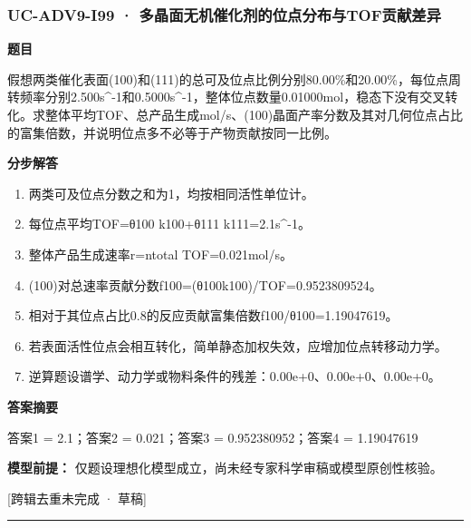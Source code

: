 \documentclass[UTF8,11pt,a4paper]{ctexart}
\begin{document}
\subsubsection*{UC-ADV9-I99 · 多晶面无机催化剂的位点分布与TOF贡献差异}
\noindent\textbf{题目}\par
假想两类催化表面(100)和(111)的总可及位点比例分别80.00\%和20.00\%，每位点周转频率分别2.500s\textasciicircum{}-1和0.5000s\textasciicircum{}-1，整体位点数量0.01000mol，稳态下没有交叉转化。求整体平均TOF、总产品生成mol/s、(100)晶面产率分数及其对几何位点占比的富集倍数，并说明位点多不必等于产物贡献按同一比例。\par
\medskip\noindent\textbf{分步解答}
\begin{enumerate}
\item 两类可及位点分数之和为1，均按相同活性单位计。
\item 每位点平均TOF=θ100 k100+θ111 k111=2.1s\textasciicircum{}-1。
\item 整体产品生成速率r=ntotal TOF=0.021mol/s。
\item (100)对总速率贡献分数f100=(θ100k100)/TOF=0.9523809524。
\item 相对于其位点占比0.8的反应贡献富集倍数f100/θ100=1.19047619。
\item 若表面活性位点会相互转化，简单静态加权失效，应增加位点转移动力学。
\item 逆算题设谱学、动力学或物料条件的残差：0.00e+0、0.00e+0、0.00e+0。
\end{enumerate}
\noindent\textbf{答案摘要}\par
答案1 = 2.1；答案2 = 0.021；答案3 = 0.952380952；答案4 = 1.19047619\par
\noindent\textbf{模型前提：}
仅题设理想化模型成立，尚未经专家科学审稿或模型原创性核验。\par
\noindent\textcolor{red!65!black}{[跨辑去重未完成 · 草稿]} \par
\medskip\hrule\medskip
{}
\end{document}
